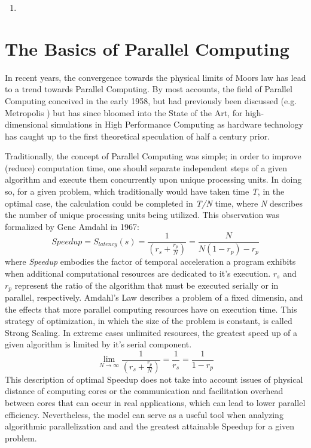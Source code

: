 \begin{enumerate}
  \item
\end{enumerate}

\cite{Muller}
\cite{DeLaurentis}
\section{The Basics of Parallel Computing}
In recent years, the convergence towards the physical limits of Moors law has lead to a
trend towards Parallel Computing\cite{Kumar}\cite{Markov}.  By most accounts, the
field of Parallel Computing conceived in the early 1958\cite{Gill}, but had previously
been discussed (e.g. Metropolis \cite{Metropolis}) but has
since bloomed into the State of the Art, for high-dimensional simulations in
High Performance Computing as hardware technology has caught up to the first
theoretical speculation of half a century prior. \par

Traditionally, the concept of Parallel Computing was simple; in order to improve
(reduce) computation time, one should separate independent steps of a given algorithm
and execute them concurrently upon unique processing units.  In doing so, for a given
problem, which traditionally would have taken time \textit{T}, in the optimal case,
the calculation could be completed in \textit{T/N} time, where \textit{N} describes
the number of unique processing units being utilized.  This observation was formalized
by Gene Amdahl in 1967\cite{Wilt}:
%
\begin{equation}
  \tag{Amdahl's Law}
  Speedup = S_{latency}(s)= \frac{1}{(r_{s} + \frac{r_{p}}{N})} = \frac{N}{N(1-r_{p})-r_{p}}
  \label{egn:Amdahl}
\end{equation}
%
where \textit{Speedup} embodies the factor of temporal acceleration a program
exhibits when additional computational resources are dedicated to it's execution.
 \textit{$r_{s}$} and \textit{$ r_{p} $} represent the ratio of the algorithm that must be executed serially or in parallel, respectively.  Amdahl's Law describes a problem of a fixed dimensin,
and the effects that more parallel computing resources have on execution time.
This strategy of optimization, in which the size of the problem is constant,
 is called Strong Scaling.
In extreme cases unlimited resources, the greatest speed up of a given algorithm
 is limited by it's serial component.
%
\begin{equation}
 \lim_{N\to\infty}  \frac{1}{(r_{s} + \frac{r_{p}}{N})} = \frac{1}{r_{s}} = \frac{1}{1-r_{p}}
\end{equation}
%
This description of optimal Speedup does not take into account issues of physical
distance of computing cores or the communication and facilitation overhead between
cores that can occur in real applications, which can lead to lower parallel efficiency.
Nevertheless, the model can serve as a useful tool when analyzing algorithmic
parallelization and and the greatest attainable Speedup for a given problem.\par

